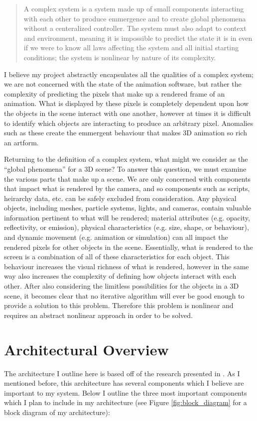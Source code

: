 \documentclass[conference]{IEEEtran}
\begin{document}
\blockquote{
A complex system is a system made up of small components interacting with each
other to produce emmergence and to create global phenomena without a centeralized
controller. The system must also adapt to context and environment, meaning it is
impossible to predict the state it is in even if we were to know all laws
affecting the system and all initial starting conditions; the system is
nonlinear by nature of its complexity.
}

I believe my project abstractly encapsulates all the qualities of a complex system;
we are not concerned with the state of the animation software, but rather the
complexity of predicting the pixels that make up a rendered frame of an
animation. What is displayed by these pixels is completely dependent upon how
the objects in the scene interact with one another, however at times it is difficult
to identify which objects are interacting to produce an arbitrary pixel.
Anomalies such as these create the emmergent behaviour that makes 3D animation so rich
an artform.

Returning to the definition of a complex system,
what might we consider as the ``global phenomena'' for a 3D scene?
To answer this question, we must examine the various parts that make up a scene.
We are only concerned with components that impact what is rendered by the
camera, and so components such as scripts, heirarchy data, etc. can be safely
excluded from consideration. Any physical objects, including meshes, particle
systems, lights, and cameras, contain valuable information pertinent to
what will be rendered; material attributes (e.g. opacity, reflectivity, or emission),
physical characteristics (e.g. size, shape, or behaviour), and dynamic movement
(e.g. animation or simulation) can all
impact the rendered pixels for other objects in the scene. Essentially, what is rendered to the
screen is a combination of all of these characteristics for each object.
This behaviour increases the visual richness of what is rendered, however in the
same way also increases the complexity of defining how objects interact with
each other. After also considering the limitless possibilities for the objects
in a 3D scene,
it becomes clear that no iterative algorithm will ever be good enough
to provide a solution to this problem. Therefore this problem is
nonlinear and requires an abstract nonlinear approach in order to be solved.

\section{Architectural Overview}
\label{sec:architecture}
The architecture I outline here is based off of the research presented in
\cite{ref:pose_guided}. As I mentioned before, this architecture has several
components which I believe are important to my system. Below I outline the three
most important components which I plan to include in my architecture (see Figure
\ref{fig:block_diagram} for a block diagram of my architecture):
\end{document}
